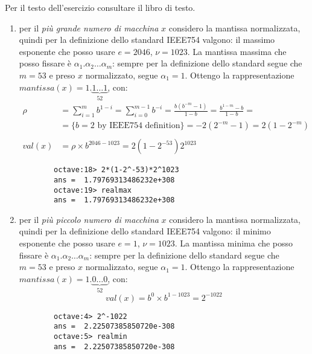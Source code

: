 \begin{exercise}[1.10]
Per il testo dell'esercizio consultare il libro di testo.
\end{exercise}
\begin{enumerate}
	\item per il \emph{pi\`u grande numero di macchina} $x$ considero la mantissa normalizzata,
	quindi per la definizione dello standard IEEE754 valgono: il massimo esponente che posso
	usare $e = 2046$, $\nu = 1023$.
	La mantissa massima che posso fissare \`e $\alpha_{1}.\alpha_{2} \ldots \alpha_{m}$:
	sempre per la definizione dello standard segue che $m = 53$ e preso $x$ normalizzato,
	segue $\alpha_{1} = 1$. Ottengo la rappresentazione 
		$mantissa(x) = 1.\underbrace{1 \ldots 1}_{52}$, con:
	\begin{displaymath}
	\begin{split}
		\rho &= \sum_{i = 1}^{m}{b^{1-i}} = \sum_{i = 0}^{m-1}{b^{-i}} = 
			\frac{b\left( b^{-m} - 1 \right)}{1 - b} = \frac{b^{1-m} - b}{1 - b} = \\
			&= \lbrace b = 2 \text{ by IEEE754 definition} \rbrace = -2(2^{-m}-1) = 
			2(1 - 2^{-m}) \\ \\
		val(x) &= \rho \times b^{2046-1023} = 2(1-2^{-53})2^{1023}
	\end{split}
	\end{displaymath}
	\begin{lstlisting}
		octave:18> 2*(1-2^-53)*2^1023
		ans =  1.79769313486232e+308
		octave:19> realmax
		ans =  1.79769313486232e+308
	\end{lstlisting}

	\item per il \emph{pi\`u piccolo numero di macchina} $x$ considero la mantissa normalizzata,
	quindi per la definizione dello standard IEEE754 valgono: il minimo esponente che posso
	usare $e = 1$, $\nu = 1023$.
	La mantissa minima che posso fissare \`e $\alpha_{1}.\alpha_{2} \ldots \alpha_{m}$:
	sempre per la definizione dello standard segue che $m = 53$ e preso $x$ normalizzato,
	segue $\alpha_{1} = 1$. Ottengo la rappresentazione 
		$mantissa(x) = 1.\underbrace{0 \ldots 0}_{52}$, con:
	\begin{displaymath}
		val(x) = b^{0} \times b^{1-1023} = 2^{-1022}
	\end{displaymath}
	\begin{lstlisting}
		octave:4> 2^-1022
		ans =  2.22507385850720e-308
		octave:5> realmin
		ans =  2.22507385850720e-308
	\end{lstlisting}


\end{enumerate}
